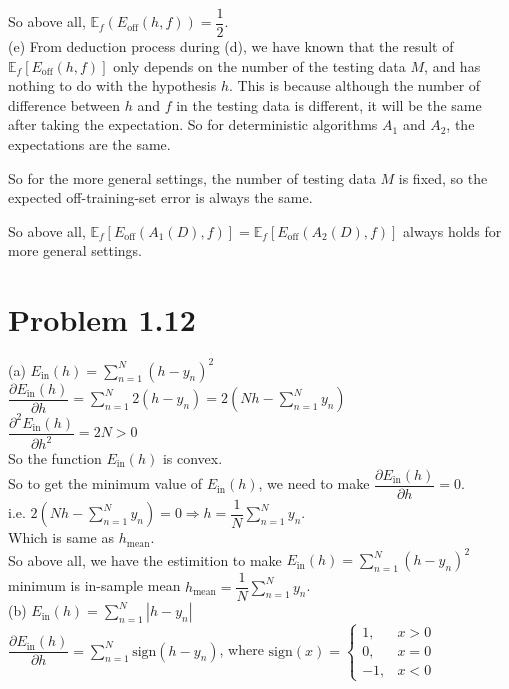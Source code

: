 \documentclass[10pt]{article}
\begin{document}
So above all, $\mathbb{E}_f(E_{\text{off}}(h,f))=\dfrac{1}{2}$.\\


(e) From deduction process during (d), we have known that the result of $\mathbb{E}_f[E_{\text{off}}(h,f)]$ only depends on the number of the testing data $M$, and has nothing to do with the hypothesis $h$.
This is because although the number of difference between $h$ and $f$ in the testing data is different, it will be the same after taking the expectation. So for deterministic algorithms $A_1$ and $A_2$, the expectations are the same. 

So for the more general settings, the number of testing data $M$ is fixed, so the expected off-training-set error is always the same.

So above all, $\mathbb{E}_f[E_{\text{off}}(A_1(D),f)]=\mathbb{E}_f[E_{\text{off}}(A_2(D),f)]$ always holds for more general settings.\\


\newpage

\section{Problem 1.12}
(a) $E_{\text{in}}(h)=\sum\limits_{n=1}^N (h-y_n)^2$\\
$\dfrac{\partial E_{\text{in}}(h)}{\partial h}=\sum\limits_{n=1}^N 2(h-y_n)=2(Nh-\sum\limits_{n=1}^Ny_n)$\\
$\dfrac{\partial^2 E_{\text{in}}(h)}{\partial h^2}=2N>0$\\
So the function $E_{\text{in}}(h)$ is convex.\\
So to get the minimum value of $E_{\text{in}}(h)$, we need to make $\dfrac{\partial E_{\text{in}}(h)}{\partial h}=0$.\\
i.e. $2(Nh-\sum\limits_{n=1}^Ny_n) = 0 \Rightarrow h=\dfrac{1}{N}\sum\limits_{n=1}^Ny_n$.\\
Which is same as $h_{\text{mean}}$.\\

So above all, we have the estimition to make $E_{\text{in}}(h)=\sum\limits_{n=1}^N (h-y_n)^2$ minimum is in-sample mean $h_{\text{mean}}=\dfrac{1}{N}\sum\limits_{n=1}^Ny_n$.\\


(b) $E_{\text{in}}(h)=\sum\limits_{n=1}^N |h-y_n|$\\
$\dfrac{\partial{E}_{\text{in}}(h)}{\partial h}=\sum\limits_{n=1}^N \text{sign}(h-y_n)$,
where $\text{sign}(x)=\begin{cases}
	1, & x>0\\
	0, & x=0\\
	-1, & x<0
\end{cases}$\\
\end{document}
